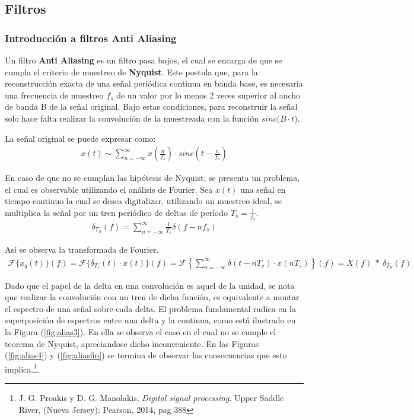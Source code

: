 


\subsection{Filtros}

\subsubsection{Introducción a filtros Anti Aliasing}
Un filtro \textbf{Anti Aliasing} es un filtro pasa bajos, el cual se encarga de que se cumpla el criterio de muestreo de \textbf{Nyquist}. Este postula que, para la reconstrucción exacta de una señal periódica continua en banda base, es necesaria una frecuencia de muestreo $f_s$ de un valor por lo menos 2 veces superior al ancho de banda B de la señal original. Bajo estas condiciones, para reconstruir la señal solo hace falta realizar la convolución de la muestreada con la función $sinc(B\cdot t$).

La señal original se puede expresar como:
\begin{align}
	x\left( t \right) \sim \sum_{n=-\infty}^{\infty} x\left( \frac{n}{f_s} \right) \cdot sinc \left( t-\frac{n}{f_s} \right)
\end{align}

En caso de que no se cumplan las hipótesis de Nyquist, se presenta un problema, el cual es observable utilizando el análisis de Fourier. Sea $x(t)$ una señal en tiempo continuo la cual se desea digitalizar, utilizando un muestreo ideal, se multiplica la señal por un tren periódico de deltas de período $T_s = \frac{1}{f_s}$.
\begin{align}
\delta_{T_S}(f)= \sum_{n=-\infty}^{\infty} \frac{1}{T_s} \delta(f-nf_s)
\end{align}

Así se observa la transformada de Fourier.
\begin{align}
	\mathcal{F} \{x_q(t) \} (f) =\mathcal{F} \{ \delta_{T_s} (t) \cdot x(t) \} (f)=\mathcal{F} \left\lbrace \sum_{n=-\infty}^{\infty} \delta(t-nT_s) \cdot x(nT_s)\right\rbrace (f)= X(f)\  *  \ \delta_{T_S}(f)
\end{align}

Dado que el papel de la delta en una convolución es aquel de la unidad, se nota que realizar la convolución con un tren de dicha función, es equivalente a montar el espectro de una señal sobre cada delta. El problema fundamental radica en la superposición de espectros entre una delta y la continua, como está ilustrado en la Figura (\ref{fig:alias3}). En ella se observa el caso en el cual no se cumple el teorema de Nyquist, apreciandose dicho inconveniente. En las Figuras (\ref{fig:alias4}) y (\ref{fig:aliasfin}) se termina de observar las consecuencias que esto implica.\footnote{J. G. Proakis y D. G. Manolakis, \textit{Digital signal processing}. Upper Saddle River, (Nueva Jersey): Pearson, 2014, pag 388}.

